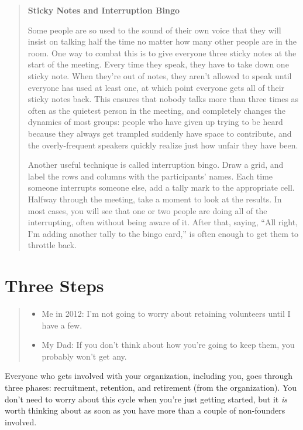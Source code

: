 \documentclass[10pt,statementpaper]{memoir}
\providecommand{\tightlist}{%
  \setlength{\itemsep}{0pt}\setlength{\parskip}{0pt}}
\begin{document}
\begin{quote}
\textbf{Sticky Notes and Interruption Bingo}

Some people are so used to the sound of their own voice that they will
insist on talking half the time no matter how many other people are in
the room. One way to combat this is to give everyone three sticky notes
at the start of the meeting. Every time they speak, they have to take
down one sticky note. When they're out of notes, they aren't allowed to
speak until everyone has used at least one, at which point everyone gets
all of their sticky notes back. This ensures that nobody talks more than
three times as often as the quietest person in the meeting, and
completely changes the dynamics of most groups: people who have given up
trying to be heard because they always get trampled suddenly have space
to contribute, and the overly-frequent speakers quickly realize just how
unfair they have been.

Another useful technique is called interruption bingo. Draw a grid, and
label the rows and columns with the participants' names. Each time
someone interrupts someone else, add a tally mark to the appropriate
cell. Halfway through the meeting, take a moment to look at the results.
In most cases, you will see that one or two people are doing all of the
interrupting, often without being aware of it. After that, saying, ``All
right, I'm adding another tally to the bingo card,'' is often enough to
get them to throttle back.
\end{quote}

\section{Three Steps}\label{three-steps}

\begin{quote}
\begin{itemize}
\tightlist
\item
  Me in 2012: I'm not going to worry about retaining volunteers until I
  have a few.
\item
  My Dad: If you don't think about how you're going to keep them, you
  probably won't get any.
\end{itemize}
\end{quote}

Everyone who gets involved with your organization, including you, goes
through three phases: recruitment, retention, and retirement (from the
organization). You don't need to worry about this cycle when you're just
getting started, but it \emph{is} worth thinking about as soon as you
have more than a couple of non-founders involved.
\end{document}
